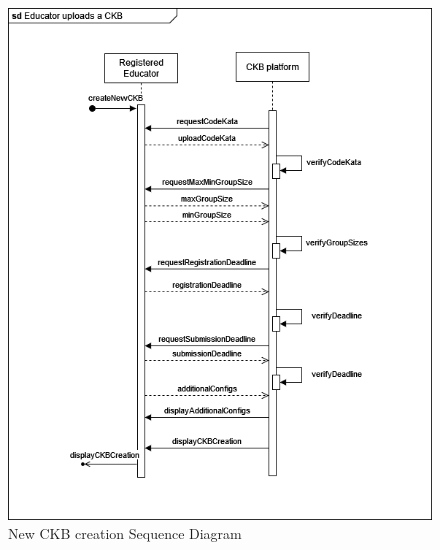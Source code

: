 \begin{center}
    \begin{figure} [H]
        \begin{center}
            \includegraphics[width=0.9\linewidth]{Images/SequenceDiagrams/SD_12.png}
            \caption{New CKB creation Sequence Diagram}
            \label{fig: new_CKB_seq_diag}
        \end{center}
    \end{figure}
\end{center}


\newpage
